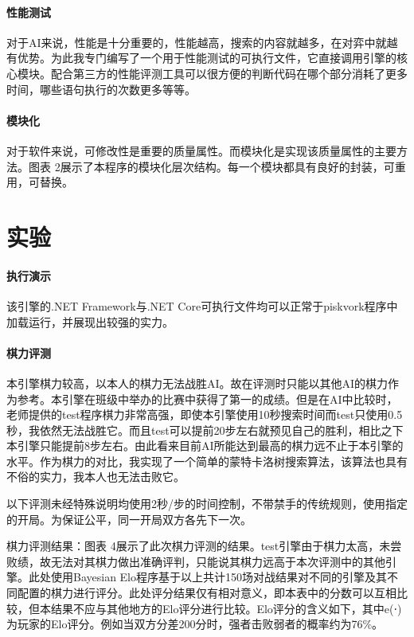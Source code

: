 \documentclass{article}
\begin{document}
\paragraph{性能测试} 对于AI来说，性能是十分重要的，性能越高，搜索的内容就越多，在对弈中就越有优势。为此我专门编写了一个用于性能测试的可执行文件，它直接调用引擎的核心模块。配合第三方的性能评测工具可以很方便的判断代码在哪个部分消耗了更多时间，哪些语句执行的次数更多等等。

\paragraph{模块化} 对于软件来说，可修改性是重要的质量属性。而模块化是实现该质量属性的主要方法。图表 2展示了本程序的模块化层次结构。每一个模块都具有良好的封装，可重用，可替换。

\section{实验}

\paragraph{执行演示} 该引擎的.NET Framework与.NET Core可执行文件均可以正常于piskvork程序中加载运行，并展现出较强的实力。

\paragraph{棋力评测} 本引擎棋力较高，以本人的棋力无法战胜AI。故在评测时只能以其他AI的棋力作为参考。本引擎在班级中举办的比赛中获得了第一的成绩。但是在AI中比较时，老师提供的test程序棋力非常高强，即使本引擎使用10秒搜索时间而test只使用0.5秒，我依然无法战胜它。而且test可以提前20步左右就预见自己的胜利，相比之下本引擎只能提前8步左右。由此看来目前AI所能达到最高的棋力远不止于本引擎的水平。作为棋力的对比，我实现了一个简单的蒙特卡洛树搜索算法，该算法也具有不俗的实力，我本人也无法击败它。

以下评测未经特殊说明均使用2秒/步的时间控制，不带禁手的传统规则，使用指定的开局。为保证公平，同一开局双方各先下一次。


棋力评测结果：图表 4展示了此次棋力评测的结果。test引擎由于棋力太高，未尝败绩，故无法对其棋力做出准确评判，只能说其棋力远高于本次评测中的其他引擎。此处使用Bayesian Elo程序基于以上共计150场对战结果对不同的引擎及其不同配置的棋力进行评分。此处评分结果仅有相对意义，即本表中的分数可以互相比较，但本结果不应与其他地方的Elo评分进行比较。Elo评分的含义如下，其中e(⋅)为玩家的Elo评分。例如当双方分差200分时，强者击败弱者的概率约为76\%。
\end{document}

